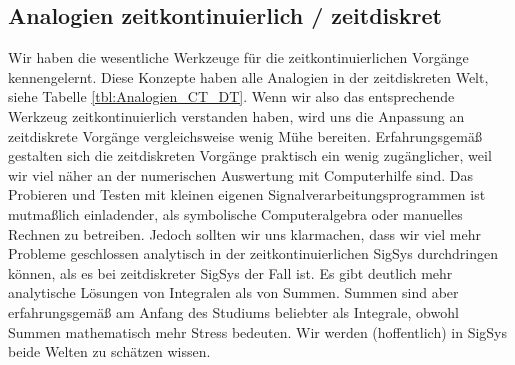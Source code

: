 \subsection*{Analogien zeitkontinuierlich / zeitdiskret}
%
Wir haben die wesentliche Werkzeuge für die zeitkontinuierlichen Vorgänge
kennengelernt. Diese Konzepte haben alle Analogien in der zeitdiskreten Welt,
siehe Tabelle \ref{tbl:Analogien_CT_DT}.
%
Wenn wir also das entsprechende Werkzeug zeitkontinuierlich verstanden haben,
wird uns die Anpassung an zeitdiskrete Vorgänge vergleichsweise wenig Mühe
bereiten. Erfahrungsgemäß gestalten sich die zeitdiskreten Vorgänge praktisch
ein wenig zugänglicher, weil wir viel näher an der numerischen Auswertung
mit Computerhilfe sind.
%
Das Probieren und Testen mit kleinen eigenen Signalverarbeitungsprogrammen
ist mutmaßlich einladender, als symbolische Computeralgebra oder
manuelles Rechnen zu betreiben.
%
Jedoch sollten wir uns klarmachen, dass wir viel mehr Probleme geschlossen analytisch
in der zeitkontinuierlichen SigSys durchdringen können, als es bei zeitdiskreter
SigSys der Fall ist.
%
Es gibt deutlich mehr analytische Lösungen von Integralen als von
Summen.
%
Summen sind aber erfahrungsgemäß am Anfang des Studiums beliebter als
Integrale, obwohl Summen mathematisch mehr Stress bedeuten.
%
Wir werden (hoffentlich) in SigSys beide Welten zu schätzen wissen.
%
%
